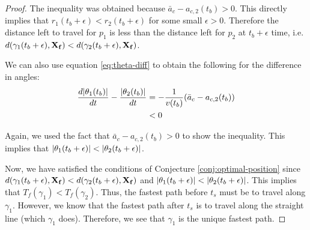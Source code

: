 \begin{proof}
The inequality was obtained because $\bar{a}_c - a_{c,2}(t_b) > 0$. This directly implies that $r_1(t_b + \epsilon) < r_2(t_b + \epsilon)$ for some small $\epsilon > 0$. Therefore the distance left to travel for $p_1$ is less than the distance left for $p_2$ at $t_b + \epsilon$ time, i.e. $d(\gamma_1(t_b + \epsilon), \mathbf{X_f}) < d(\gamma_2(t_b + \epsilon), \mathbf{X_f})$.

We can also use equation \ref{eq:theta-diff} to obtain the following for the difference in angles:
\begin{align*}
  \frac{d \abs{\theta_1(t_b)}}{dt} - \frac{\abs{\theta_2 (t_b)}}{dt}& = - \frac{1}{v(t_b)} \paren{\bar{a}_c - a_{c,2}(t_b)}\\
  & < 0
\end{align*}

Again, we used the fact that $\bar{a}_c - a_{c,2}(t_b) > 0$ to show the inequality. This implies that $\abs{\theta_1(t_b + \epsilon)} < \abs{\theta_2(t_b + \epsilon)}$.

Now, we have satisfied the conditions of Conjecture \ref{conj:optimal-position} since $d(\gamma_1(t_b + \epsilon), \mathbf{X_f}) < d(\gamma_2(t_b + \epsilon), \mathbf{X_f})$ and $\abs{\theta_1(t_b + \epsilon)} < \abs{\theta_2(t_b + \epsilon)}$. This implies that $T_f(\gamma_1) < T_f(\gamma_2)$. Thus, the fastest path before $t_s$ must be to travel along $\gamma_1$. However, we know that the fastest path after $t_s$ is to travel along the straight line (which $\gamma_1$ does). Therefore, we see that $\gamma_1$ is the unique fastest path.
\end{proof}